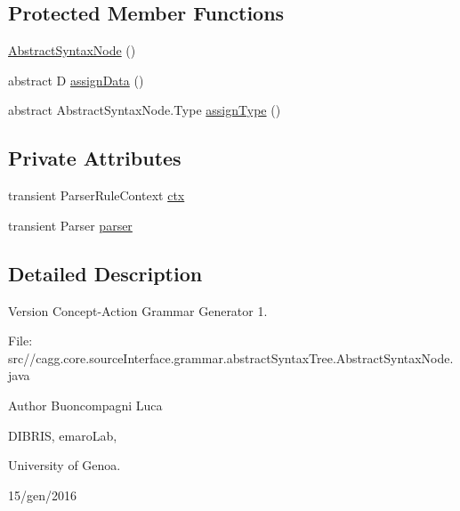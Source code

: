 \subsection*{Protected Member Functions}
\begin{DoxyCompactItemize}
\item 
\hyperlink{classit_1_1emarolab_1_1cagg_1_1core_1_1language_1_1syntax_1_1abstractTree_1_1AbstractSyntaxNode_366ce7377666ed8848a32408270165e9_adb7bf2bbee0bedafce609e7d3c61c8a6}{Abstract\-Syntax\-Node} ()
\item 
abstract D \hyperlink{classit_1_1emarolab_1_1cagg_1_1core_1_1language_1_1syntax_1_1abstractTree_1_1AbstractSyntaxNode_366ce7377666ed8848a32408270165e9_a3d3fe91919230fee8c8276ff6b9c8599}{assign\-Data} ()
\item 
abstract Abstract\-Syntax\-Node.\-Type \hyperlink{classit_1_1emarolab_1_1cagg_1_1core_1_1language_1_1syntax_1_1abstractTree_1_1AbstractSyntaxNode_366ce7377666ed8848a32408270165e9_a506561bb1e45e2588109023f766710e4}{assign\-Type} ()
\end{DoxyCompactItemize}
\subsection*{Private Attributes}
\begin{DoxyCompactItemize}
\item 
transient Parser\-Rule\-Context \hyperlink{classit_1_1emarolab_1_1cagg_1_1core_1_1language_1_1syntax_1_1abstractTree_1_1AbstractSyntaxNode_366ce7377666ed8848a32408270165e9_a5f2fc206d7f95eb3df51386a3379fa41}{ctx}
\item 
transient Parser \hyperlink{classit_1_1emarolab_1_1cagg_1_1core_1_1language_1_1syntax_1_1abstractTree_1_1AbstractSyntaxNode_366ce7377666ed8848a32408270165e9_a62dbf3357a74a39f5b4094ecef90a168}{parser}
\end{DoxyCompactItemize}


\subsection{Detailed Description}
\begin{DoxyVersion}{Version}
Concept-\/\-Action Grammar Generator 1. \par
 File\-: src//cagg.core.\-source\-Interface.\-grammar.\-abstract\-Syntax\-Tree.\-Abstract\-Syntax\-Node.\-java \par

\end{DoxyVersion}
\begin{DoxyAuthor}{Author}
Buoncompagni Luca \par
 D\-I\-B\-R\-I\-S, emaro\-Lab,\par
 University of Genoa. \par
 15/gen/2016 \par

\end{DoxyAuthor}


